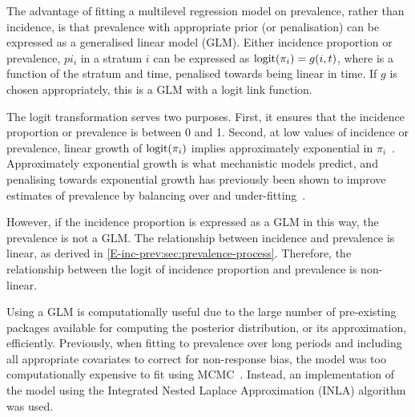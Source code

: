 \documentclass[thesis.tex]{subfiles}
\begin{document}
The advantage of fitting a multilevel regression model on prevalence, rather than incidence, is that prevalence with appropriate prior (or penalisation) can be expressed as a generalised linear model (GLM).
Either incidence proportion or prevalence, $pi_i$ in a stratum $i$ can be expressed as $\operatorname{logit}(\pi_i) = g(i, t)$, where is a function of the stratum and time, penalised towards being linear in time.
If $g$ is chosen appropriately, this is a GLM with a logit link function.

The logit transformation serves two purposes.
First, it ensures that the incidence proportion or prevalence is between 0 and 1.
Second, at low values of incidence or prevalence, linear growth of $\operatorname{logit}(\pi_i)$ implies approximately exponential in $\pi_i$~\autocite[see discussion in][and references therein]{ealesAppropriately}.
Approximately exponential growth is what mechanistic models predict, and penalising towards exponential growth has previously been shown to improve estimates of prevalence by balancing over and under-fitting~\autocite{ealesAppropriately}.

However, if the incidence proportion is expressed as a GLM in this way, the prevalence is not a GLM.
The relationship between incidence and prevalence is linear, as derived in \cref{E-inc-prev:sec:prevalence-process}.
Therefore, the relationship between the logit of incidence proportion and prevalence is non-linear.

Using a GLM is computationally useful due to the large number of pre-existing packages available for computing the posterior distribution, or its approximation, efficiently.
Previously, when fitting to prevalence over long periods and including all appropriate covariates to correct for non-response bias, the model was too computationally expensive to fit using MCMC~.
Instead, an implementation of the model using the Integrated Nested Laplace Approximation (INLA) algorithm was used.
\end{document}
